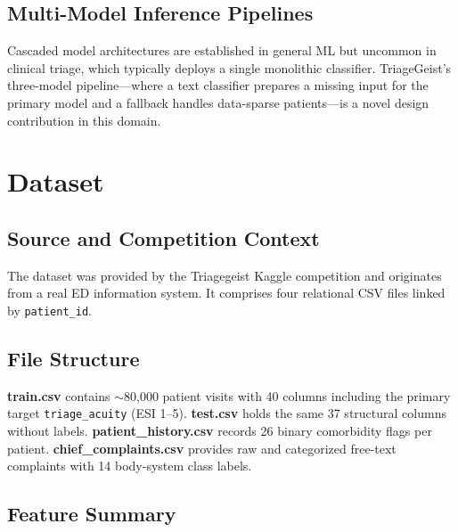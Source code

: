 \documentclass[conference]{IEEEtran}
\begin{document}
\subsection{Multi-Model Inference Pipelines}
Cascaded model architectures are established in general ML but uncommon in clinical triage, which typically deploys a single monolithic classifier. TriageGeist's three-model pipeline---where a text classifier prepares a missing input for the primary model and a fallback handles data-sparse patients---is a novel design contribution in this domain.

\section{Dataset}

\subsection{Source and Competition Context}
The dataset was provided by the Triagegeist Kaggle competition and originates from a real ED information system. It comprises four relational CSV files linked by \texttt{patient\_id}.

\subsection{File Structure}
\textbf{train.csv} contains $\sim$80,000 patient visits with 40 columns including the primary target \texttt{triage\_acuity} (ESI 1--5). \textbf{test.csv} holds the same 37 structural columns without labels. \textbf{patient\_history.csv} records 26 binary comorbidity flags per patient. \textbf{chief\_complaints.csv} provides raw and categorized free-text complaints with 14 body-system class labels.

\subsection{Feature Summary}
\end{document}
